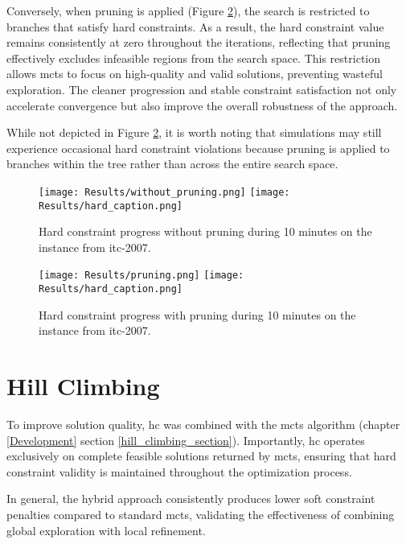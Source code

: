 Conversely, when pruning is applied (Figure \ref{fig:pruning_result}), the search is restricted to branches that satisfy hard constraints. As a result, the hard constraint value remains consistently at zero throughout the iterations, reflecting that pruning effectively excludes infeasible regions from the search space. This restriction allows \ac{mcts} to focus on high-quality and valid solutions, preventing wasteful exploration. The cleaner progression and stable constraint satisfaction not only accelerate convergence but also improve the overall robustness of the approach. 

While not depicted in Figure \ref{fig:pruning_result}, it is worth noting that simulations may still experience occasional hard constraint violations because pruning is applied to branches within the tree rather than across the entire search space.

\begin{figure}
 \centering
     \texttt{[image: Results/without\_pruning.png]}
     \texttt{[image: Results/hard\_caption.png]}
     \caption{Hard constraint progress without pruning during 10 minutes on the  instance from \ac{itc-2007}.}
     \label{fig:without_pruning_result}
\end{figure}

\begin{figure}
 \centering
    \texttt{[image: Results/pruning.png]}
    \texttt{[image: Results/hard\_caption.png]}
    \caption{Hard constraint progress with pruning during 10 minutes on the  instance from \ac{itc-2007}.}
    \label{fig:pruning_result}
\end{figure}

\section{Hill Climbing}

To improve solution quality, \ac{hc} was combined with the \ac{mcts} algorithm (chapter \ref{Development} section \ref{hill_climbing_section}). Importantly, \ac{hc} operates exclusively on complete feasible solutions returned by \ac{mcts}, ensuring that hard constraint validity is maintained throughout the optimization process.

In general, the hybrid approach consistently produces lower soft constraint penalties compared to standard \ac{mcts}, validating the effectiveness of combining global exploration with local refinement. 

